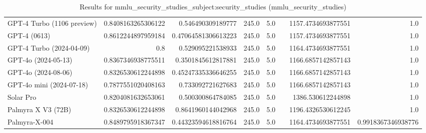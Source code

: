 \begin{table}[htp]
{\begin{tabular}{lrrrrrrr}
GPT-4 Turbo (1106 preview) & 0.8408163265306122 & 0.546490309189777 & 245.0 & 5.0 &  & 1157.4734693877551 & 1.0 \\
GPT-4 (0613) & 0.8612244897959184 & 0.47064581306613223 & 245.0 & 5.0 &  & 1157.4734693877551 & 1.0 \\
GPT-4 Turbo (2024-04-09) & 0.8 & 0.529095221538933 & 245.0 & 5.0 &  & 1164.4734693877551 & 1.0 \\
GPT-4o (2024-05-13) & 0.8367346938775511 & 0.3501845612817881 & 245.0 & 5.0 &  & 1166.6857142857143 & 1.0 \\
GPT-4o (2024-08-06) & 0.8326530612244898 & 0.45247335336646255 & 245.0 & 5.0 &  & 1166.6857142857143 & 1.0 \\
GPT-4o mini (2024-07-18) & 0.7877551020408163 & 0.733092721627683 & 245.0 & 5.0 &  & 1166.6857142857143 & 1.0 \\
Solar Pro & 0.8204081632653061 & 0.500300864784085 & 245.0 & 5.0 &  & 1386.530612244898 & 1.0 \\
Palmyra X V3 (72B) & 0.8326530612244898 & 0.8641960144042968 & 245.0 & 5.0 &  & 1196.4326530612245 & 1.0 \\
Palmyra-X-004 & 0.8489795918367347 & 0.44323594618816764 & 245.0 & 5.0 &  & 1164.4734693877551 & 0.9918367346938776 \\
\bottomrule
\end{tabular}}
\caption{Results for mmlu_security_studies_subject:security_studies (mmlu_security_studies)}
\label{fig:mmlu_security_studies_subject:security_studies (mmlu_security_studies)}
\end{table}